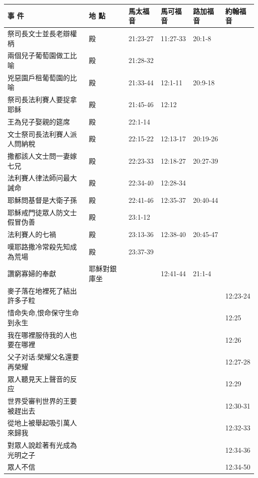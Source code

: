 \begin{table}[H]\centering
\begin{tabular}{p{14em}|p{7.93em}|l|l|l|p{4.855em}} \toprule
\textbf{事 件} & \textbf{地 點} & \multicolumn{1}{p{5.285em}|}{\textbf{馬太福音}} & \multicolumn{1}{p{5.57em}|}{\textbf{馬可福音}} & \multicolumn{1}{p{5.285em}|}{\textbf{路加福音}} & \textbf{約翰福音} \\  \midrule
祭司長文士並長老辯權柄&殿 & 21:23-27 &11:27-33&20:1-8&  \\\midrule
兩個兒子葡萄園做工比喻&殿 & 21:28-32 &&&  \\\midrule
兇惡園戶租葡萄園的比喻&殿 &21:33-44 & 12:1-11 &20:9-18&  \\\midrule
祭司長法利賽人要捉拿耶稣&殿 &21:45-46&  12:12     &&  \\\midrule

王為兒子娶親的筵席&殿 &22:1-14&      &&  \\\midrule

文士祭司長法利賽人派人問納稅& 殿   &  22:15-22     &12:13-17  &20:19-26&  \\\midrule
撒都該人文士問一妻嫁七兄& 殿 & 22:23-33 & 12:18-27 &20:27-39&  \\\midrule

法利賽人律法師问最大誡命&殿 &22:34-40&  12:28-34  &&  \\\midrule
耶穌問基督是大衛子孫&   殿    &22:41-46  &  12:35-37  &20:40-44&  \\\midrule
耶穌戒門徒眾人防文士假冒伪善&殿&23:1-12   &&&  \\\midrule

法利賽人的七禍& 殿&23:13-36   &12:38-40&20:45-47&  \\\midrule

嘆耶路撒冷常殺先知成為荒場& 殿&23:37-39 & &       &  \\\midrule

讚窮寡婦的奉獻&耶穌對銀庫坐&       &12:41-44&21:1-4&  \\\midrule

麥子落在地裡死了結出許多子粒&&       &&&12:23-24\\\midrule
惜命失命,恨命保守生命到永生&&       &&&12:25 \\\midrule
我在哪裡服侍我的人也要在哪裡&&       &&&12:26  \\\midrule
父子对话:榮耀父名還要再榮耀&&       &&&12:27-28  \\\midrule
眾人聽見天上聲音的反应&&       &&&12:29\\\midrule
世界受審判世界的王要被趕出去&&       &&&12:30-31\\\midrule
從地上被舉起吸引萬人來歸我&&       &&&12:32-33\\\midrule
對眾人說趁著有光成為光明之子&&       &&&12:34-36\\\midrule
眾人不信&&       &&&12:34-50\\\midrule
\end{tabular}%
\end{table}




